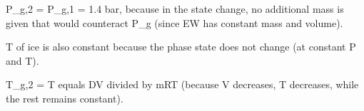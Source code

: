 P_g,2 = P_g,1 = 1.4 bar, because in the state change, no additional mass is given that would counteract P_g (since EW has constant mass and volume).  

T of ice is also constant because the phase state does not change (at constant P and T).  

T_g,2 = T equals DV divided by mRT (because V decreases, T decreases, while the rest remains constant).